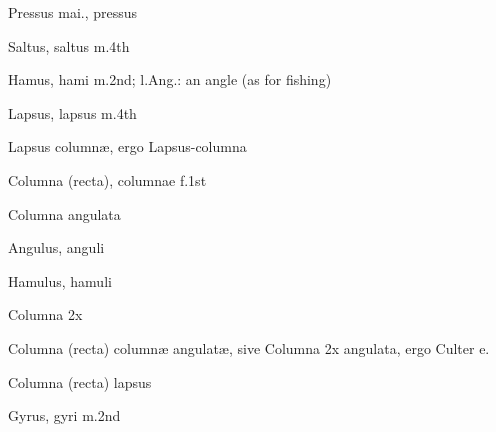  {\mktsStyleItalic{}Pressus mai.\/}, pressus


 {\mktsStyleItalic{}Saltus\/}, saltus {\mktsStyleItalic{}m.4th\/}


 {\mktsStyleItalic{}Hamus\/}, hami {\mktsStyleItalic{}m.2nd\/}; l.Ang.: an angle (as for fishing)


 {\mktsStyleItalic{}Lapsus\/}, lapsus {\mktsStyleItalic{}m.4th\/}


 {\mktsStyleItalic{}Lapsus columnæ\/}, ergo {\mktsStyleItalic{}Lapsus-columna\/}


 {\mktsStyleItalic{}Columna (recta)\/}, columnae {\mktsStyleItalic{}f.1st\/}


	{\mktsStyleItalic{}Columna angulata\/}


 {\mktsStyleItalic{}Angulus\/}, anguli


 {\mktsStyleItalic{}Hamulus\/}, hamuli


 {\mktsStyleItalic{}Columna 2x\/}


 {\mktsStyleItalic{}Columna (recta) columnæ angulatæ\/}, sive {\mktsStyleItalic{}Columna 2x angulata\/}, ergo {\mktsStyleItalic{}Culter e.\/}


 {\mktsStyleItalic{}Columna (recta) lapsus\/}


 {\mktsStyleItalic{}Gyrus\/}, gyri {\mktsStyleItalic{}m.2nd\/}


